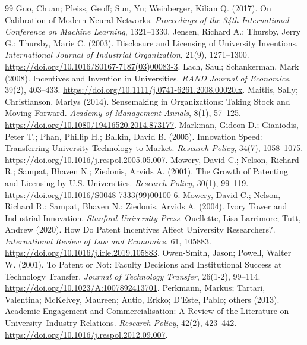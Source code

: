 \begin{thebibliography}{99}
 Guo, Chuan; Pleiss, Geoff; Sun, Yu; Weinberger, Kilian Q. (2017). On Calibration of Modern Neural Networks. \emph{Proceedings of the 34th International Conference on Machine Learning}, 1321--1330.
 Jensen, Richard A.; Thursby, Jerry G.; Thursby, Marie C. (2003). Disclosure and Licensing of University Inventions. \emph{International Journal of Industrial Organization}, 21(9), 1271--1300. \url{https://doi.org/10.1016/S0167-7187(03)00083-3}.
 Lach, Saul; Schankerman, Mark (2008). Incentives and Invention in Universities. \emph{RAND Journal of Economics}, 39(2), 403--433. \url{https://doi.org/10.1111/j.0741-6261.2008.00020.x}.
 Maitlis, Sally; Christianson, Marlys (2014). Sensemaking in Organizations: Taking Stock and Moving Forward. \emph{Academy of Management Annals}, 8(1), 57--125. \url{https://doi.org/10.1080/19416520.2014.873177}.
 Markman, Gideon D.; Gianiodis, Peter T.; Phan, Phillip H.; Balkin, David B. (2005). Innovation Speed: Transferring University Technology to Market. \emph{Research Policy}, 34(7), 1058--1075. \url{https://doi.org/10.1016/j.respol.2005.05.007}.
 Mowery, David C.; Nelson, Richard R.; Sampat, Bhaven N.; Ziedonis, Arvids A. (2001). The Growth of Patenting and Licensing by U.S. Universities. \emph{Research Policy}, 30(1), 99--119. \url{https://doi.org/10.1016/S0048-7333(99)00100-6}.
 Mowery, David C.; Nelson, Richard R.; Sampat, Bhaven N.; Ziedonis, Arvids A. (2004). Ivory Tower and Industrial Innovation. \emph{Stanford University Press}.
 Ouellette, Lisa Larrimore; Tutt, Andrew (2020). How Do Patent Incentives Affect University Researchers?. \emph{International Review of Law and Economics}, 61, 105883. \url{https://doi.org/10.1016/j.irle.2019.105883}.
 Owen-Smith, Jason; Powell, Walter W. (2001). To Patent or Not: Faculty Decisions and Institutional Success at Technology Transfer. \emph{Journal of Technology Transfer}, 26(1-2), 99--114. \url{https://doi.org/10.1023/A:1007892413701}.
 Perkmann, Markus; Tartari, Valentina; McKelvey, Maureen; Autio, Erkko; D'Este, Pablo; others (2013). Academic Engagement and Commercialisation: A Review of the Literature on University--Industry Relations. \emph{Research Policy}, 42(2), 423--442. \url{https://doi.org/10.1016/j.respol.2012.09.007}.

\end{thebibliography}
